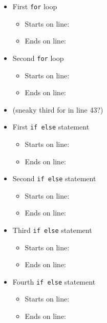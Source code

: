 \documentclass[
]{book}
\providecommand{\tightlist}{%
  \setlength{\itemsep}{0pt}\setlength{\parskip}{0pt}}
\begin{document}
\begin{itemize}
\item
  First \texttt{for} loop

  \begin{itemize}
  \tightlist
  \item
    Starts on line:
  \item
    Ends on line:
  \end{itemize}
\item
  Second \texttt{for} loop

  \begin{itemize}
  \tightlist
  \item
    Starts on line:
  \item
    Ends on line:
  \end{itemize}
\item
  (sneaky third for in line 43?)
\item
  First \texttt{if\ else} statement

  \begin{itemize}
  \tightlist
  \item
    Starts on line:
  \item
    Ends on line:
  \end{itemize}
\item
  Second \texttt{if\ else} statement

  \begin{itemize}
  \tightlist
  \item
    Starts on line:
  \item
    Ends on line:
  \end{itemize}
\item
  Third \texttt{if\ else} statement

  \begin{itemize}
  \tightlist
  \item
    Starts on line:
  \item
    Ends on line:
  \end{itemize}
\item
  Fourth \texttt{if\ else} statement

  \begin{itemize}
  \tightlist
  \item
    Starts on line:
  \item
    Ends on line:
  \end{itemize}
\end{itemize}
\end{document}
